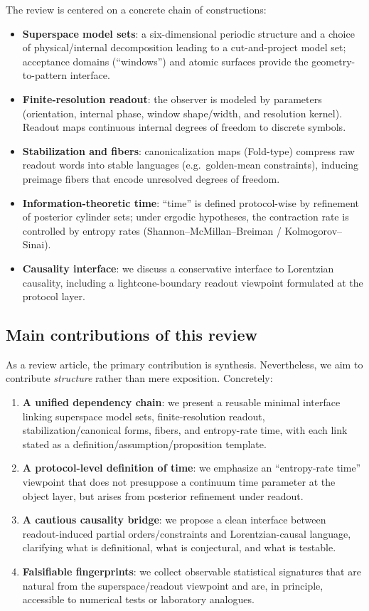 The review is centered on a concrete chain of constructions:
\begin{itemize}[leftmargin=*,itemsep=2pt]
  \item \textbf{Superspace model sets}: a six-dimensional periodic structure and a choice of physical/internal decomposition leading to a cut-and-project model set; acceptance domains (``windows'') and atomic surfaces provide the geometry-to-pattern interface.
  \item \textbf{Finite-resolution readout}: the observer is modeled by parameters (orientation, internal phase, window shape/width, and resolution kernel). Readout maps continuous internal degrees of freedom to discrete symbols.
  \item \textbf{Stabilization and fibers}: canonicalization maps (Fold-type) compress raw readout words into stable languages (e.g.\ golden-mean constraints), inducing preimage fibers that encode unresolved degrees of freedom.
  \item \textbf{Information-theoretic time}: ``time'' is defined protocol-wise by refinement of posterior cylinder sets; under ergodic hypotheses, the contraction rate is controlled by entropy rates (Shannon--McMillan--Breiman / Kolmogorov--Sinai).
  \item \textbf{Causality interface}: we discuss a conservative interface to Lorentzian causality, including a lightcone-boundary readout viewpoint formulated at the protocol layer.
\end{itemize}

\subsection{Main contributions of this review}

As a review article, the primary contribution is synthesis. Nevertheless, we aim to contribute \emph{structure} rather than mere exposition. Concretely:
\begin{enumerate}[label=\textbf{C\arabic*.},leftmargin=*,itemsep=2pt]
  \item \textbf{A unified dependency chain}: we present a reusable minimal interface linking superspace model sets, finite-resolution readout, stabilization/canonical forms, fibers, and entropy-rate time, with each link stated as a definition/assumption/proposition template.
  \item \textbf{A protocol-level definition of time}: we emphasize an ``entropy-rate time'' viewpoint that does not presuppose a continuum time parameter at the object layer, but arises from posterior refinement under readout.
  \item \textbf{A cautious causality bridge}: we propose a clean interface between readout-induced partial orders/constraints and Lorentzian-causal language, clarifying what is definitional, what is conjectural, and what is testable.
  \item \textbf{Falsifiable fingerprints}: we collect observable statistical signatures that are natural from the superspace/readout viewpoint and are, in principle, accessible to numerical tests or laboratory analogues.
\end{enumerate}

